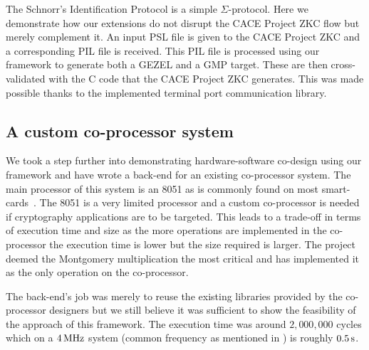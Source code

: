 
The Schnorr's Identification Protocol is a simple
$\Sigma$-protocol. Here we demonstrate how our extensions do not
disrupt the CACE Project ZKC flow but merely complement it. An input
PSL file is given to the CACE Project ZKC and a corresponding PIL file
is received. This PIL file is processed using our framework to
generate both a GEZEL and a GMP target. These are then cross-validated
with the C code that the CACE Project ZKC generates. This was made
possible thanks to the implemented terminal port communication
library.

\subsection{A custom co-processor system}

We took a step further into demonstrating hardware-software co-design
using our framework and have wrote a back-end for an existing
co-processor system. The main processor of this system is an 8051 as
is commonly found on most
smart-cards~\cite{smartcard_crypto_coprocs2}. The 8051 is a very
limited processor and a custom co-processor is needed if cryptography
applications are to be targeted. This leads to a trade-off in terms of
execution time and size as the more operations are implemented in the
co-processor the execution time is lower but the size required is
larger. The project deemed the Montgomery multiplication the most
critical and has implemented it as the only operation on the
co-processor.

The back-end's job was merely to reuse the existing libraries provided
by the co-processor designers but we still believe it was sufficient
to show the feasibility of the approach of this framework. The
execution time was around $2,000,000$ cycles which on a
$\unit[4]{MHz}$ system (common frequency as mentioned in
\cite{smartcard_crypto_coprocs2}) is roughly $\unit[0.5]{s}$.

